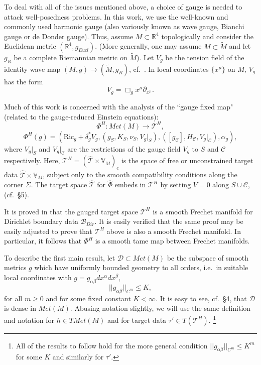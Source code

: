 \documentclass[10pt]{amsart}
\renewcommand{\a}{\alpha}
\renewcommand{\b}{\beta}
\renewcommand{\d}{\delta}
\newcommand{\Si}{\Sigma}
\newcommand{\cC}{{\mathcal C}}
\newcommand{\cT}{{\mathcal T}}
\newcommand{\cB}{{\mathcal B}}
\newcommand{\cD}{{\mathcal D}}
\newcommand{\bR}{\mathbb R}
\newcommand{\bV}{\mathbb V}
\newcommand{\Ric}{\mathrm{Ric}}
\newcommand{\be}{\begin{equation}}
\newcommand{\ee}{\end{equation}}
\newcommand{\p}{\partial}
\renewcommand{\to}{\rightarrow}
\renewcommand{\hat}{\widehat}
\newcommand{\<}{\langle}
\renewcommand{\>}{\rangle}
\newcommand{\w}{\widetilde}
\theoremstyle{plain}
\theoremstyle{remark}
\theoremstyle{definition}
\numberwithin{equation}{section}
\begin{document}
\medskip 

  To deal with all of the issues mentioned above, a choice of gauge is needed to attack well-posedness problems. In this work, we use the well-known 
and commonly used harmonic gauge (also variously known as wave gauge, Bianchi gauge or de Donder gauge). Thus, assume $M \subset \bR^4$ 
topologically and consider the Euclidean metric $(\bR^4, g_{Eucl})$. (More generally, one may assume $M \subset \w M$ and let $g_R$ be a 
complete Riemannian metric on $\w M$). Let $V_g$ be the tension field of the identity wave map $(M, g) \to (\w M, g_R)$, cf.~\cite{GG}. In local 
coordinates $\{x^{\mu}\}$ on $M$, $V_g$ has the form 
$$V_g = \Box_g x^{\mu}\p_{x^{\mu}}.$$

  Much of this work is concerned with the analysis of the ``gauge fixed map" (related to the gauge-reduced Einstein equations):
\be \label{PhiH}
\Phi^H: Met(M) \to \cT^H,
\ee
$$\Phi^H(g) = (\Ric_g + \d_g^* V_g, (g_S, K_S, \nu_S, V_g|_{S}), ([g_{\cC}], H_{\cC}, V_g|_{\cC}), \a_g),$$
where $V_g|_S$ and $V_g|_{\cC}$ are the restrictions of the gauge field $V_g$ to $S$ and $\cC$ respectively. Here, $\cT^H = 
(\hat \cT \times \bV_M)_c$ is the space of free or unconstrained target data $\hat \cT \times \bV_M$, subject only to the smooth 
compatibility conditions along the corner $\Si$. The target space $\hat \cT$ for $\hat \Phi$ embeds in $\cT^H$ by setting $V = 0$ 
along $S\cup \cC$, (cf.~\S 5). 

   It is proved in \cite{I} that the gauged target space $\cT^H$ is a smooth Frechet manifold for Dirichlet boundary data $\cB_{Dir}$. It is 
easily verified that the same proof may be easily adjusted to prove that $\cT^H$ above is also a smooth Frechet manifold. In particular, 
it follows that $\Phi^H$ is a smooth tame map between Frechet manifolds. 

\medskip 

  To describe the first main result, let $\cD \subset Met(M)$ be the subspace of smooth metrics $g$ which have uniformly bounded geometry to 
all orders, i.e.~in suitable local coordinates with $g = g_{\a\b}dx^{\a}dx^{\b}$, 
$$||g_{\a\b}||_{C^m} \leq K,$$
for all $m \geq 0$ and for some fixed constant $K < \infty$. It is easy to see, cf.~\S 4, that $\cD$ is dense in $Met(M)$. 
Abusing notation slightly, we will use the same definition and notation for $h \in TMet(M)$ and for target data $\tau' \in T(\cT^H)$.
\footnote{All of the results to follow hold for the more general condition $||g_{\a\b}||_{C^m} \leq K^m$ for some $K$ and similarly for $\tau'$.} 
\end{document}
